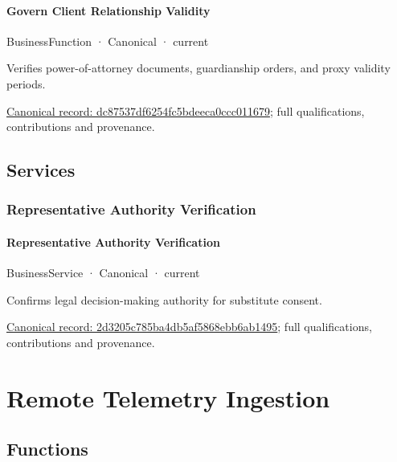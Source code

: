 \paragraph{Govern Client Relationship Validity}

\label{element:dc87537df6254fc5bdeeca0ccc011679}
{\small BusinessFunction · Canonical · current}\par

Verifies power-of-attorney documents, guardianship orders, and proxy validity periods.


{\footnotesize \href{../../../../continuum/business/business-function/dc87537df6254fc5bdeeca0ccc011679.md}{Canonical record: dc87537df6254fc5bdeeca0ccc011679}; full qualifications, contributions and provenance.}\par
\subsection{Services}

\subsubsection{Representative Authority Verification}

\paragraph{Representative Authority Verification}

\label{element:2d3205c785ba4db5af5868ebb6ab1495}
{\small BusinessService · Canonical · current}\par

Confirms legal decision-making authority for substitute consent.


{\footnotesize \href{../../../../continuum/business/business-service/2d3205c785ba4db5af5868ebb6ab1495.md}{Canonical record: 2d3205c785ba4db5af5868ebb6ab1495}; full qualifications, contributions and provenance.}\par
\section{Remote Telemetry Ingestion}

\subsection{Functions}

